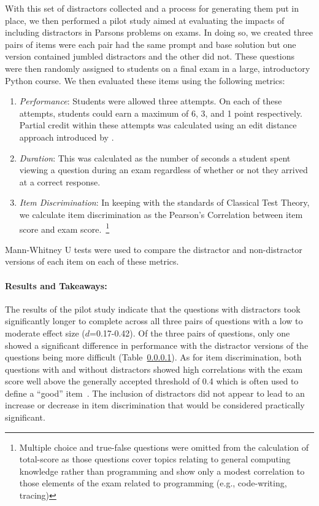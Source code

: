 \documentclass[authorversion,nonacm]{acmart}
\begin{document}
With this set of distractors collected and a process for generating them put in
place, we then performed a pilot study aimed at evaluating the impacts of including
distractors in Parsons problems on exams. In doing so, we created three pairs of items
were each pair had the same prompt and base solution but one version contained jumbled
distractors and the other did not. These questions were then randomly assigned to
students on a final exam in a large, introductory Python course.  We then
evaluated these items using the following metrics: 
\begin{enumerate}
    \item \textit{Performance}: Students were allowed three attempts. On each of these attempts, students could earn a maximum of 6, 3, and 1 point respectively. Partial credit within these attempts was calculated using an edit distance approach introduced by \citet{poulsen2022efficient}.
    \item \textit{Duration}: This was calculated as the number of seconds a student spent viewing a question during an exam regardless of whether or not they arrived at a correct response.
    \item \textit{Item Discrimination}: In keeping with the standards of Classical Test Theory, we calculate item discrimination as the Pearson's Correlation between item score and exam score.~\footnote{Multiple choice and true-false questions were omitted from the calculation of total-score as those questions cover topics relating to general computing knowledge rather than programming and show only a modest correlation to those elements of the exam related to programming (e.g., code-writing, tracing)}
\end{enumerate}
Mann-Whitney U tests were used to compare the distractor and non-distractor
versions of each item on each of these metrics.

\paragraph{Results and Takeaways:}

The results of the pilot study indicate that the questions with distractors
took significantly longer to complete across all three pairs of questions with
a low to moderate effect size ($d$=0.17-0.42). Of the three pairs of questions,
only one showed a significant difference in performance with the distractor
versions of the questions being more difficult (Table~\ref{}).  As for item
discrimination, both questions with and without distractors showed high
correlations with the exam score well above the generally accepted threshold of
0.4 which is often used to define a ``good'' item~\cite{matlock1997basic}. The
inclusion of distractors did not appear to lead to an increase or decrease in
item discrimination that would be considered practically significant.
\end{document}
